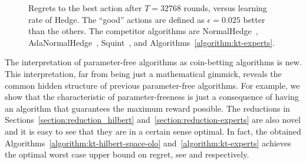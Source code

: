 \begin{figure}[t]
\centering
{}
\caption{\footnotesize{Regrets to the best action after $T = 32768$ rounds, versus learning rate of Hedge. The ``good'' actions are defined as $\epsilon=0.025$ better than the others. The competitor algorithms are NormalHedge~\cite{Chaudhuri-Freund-Hsu-2009}, AdaNormalHedge~\cite{Luo-Schapire-2015}, Squint~\cite{Koolen-van-Erven-2015}, and Algorithms~\ref{algorithm:kt-experts}.}}
\label{fig:exp_lea}
\end{figure}

The interpretation of parameter-free algorithms as coin-betting algorithms is
new. This interpretation, far from being just a mathematical gimmick, reveals
the common hidden structure of previous parameter-free algorithms. For example,
we show that the characteristic of parameter-freeness is just a consequence of
having an algorithm that guarantees the maximum reward possible.
The reductions in Sections~\ref{section:reduction_hilbert} and~\ref{section:reduction-experts} are also novel and it is easy to see that they are in a
certain sense optimal. In fact, the obtained
Algorithms~\ref{algorithm:kt-hilbert-space-olo} and~\ref{algorithm:kt-experts}
achieves the optimal worst case upper bound on regret, see \cite{Streeter-McMahan-2012,Orabona-2013}
and \cite{Cesa-Bianchi-Lugosi-2006} respectively.

